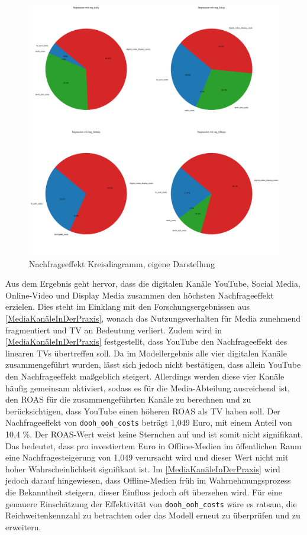 \begin{figure}[H]
    \centering
    \includegraphics[width=1\linewidth]{images/pie_charts_media_regression.png}
    \caption{Nachfrageeffekt Kreisdiagramm, eigene Darstellung}
    \label{fig:nachfrageeffekteKreisdiagramm}
\end{figure}
Aus dem Ergebnis geht hervor, dass die digitalen Kanäle YouTube, Social Media, Online-Video und Display Media zusammen den höchsten Nachfrageeffekt erzielen. Dies steht im Einklang mit den Forschungsergebnissen aus \autoref{MediaKanäleInDerPraxis}, wonach das Nutzungsverhalten für Media zunehmend fragmentiert und TV an Bedeutung verliert. Zudem wird in \autoref{MediaKanäleInDerPraxis} festgestellt, dass YouTube den Nachfrageeffekt des linearen TVs übertreffen soll. Da im Modellergebnis alle vier digitalen Kanäle zusammengeführt wurden, lässt sich jedoch nicht bestätigen, dass allein YouTube den Nachfrageeffekt maßgeblich steigert. Allerdings werden diese vier Kanäle häufig gemeinsam aktiviert, sodass es für die Media-Abteilung ausreichend ist, den \ac{ROAS} für die zusammengeführten Kanäle zu berechnen und zu berücksichtigen, dass YouTube einen höheren \ac{ROAS} als TV haben soll. Der Nachfrageeffekt von \verb|dooh_ooh_costs| beträgt 1,049 Euro, mit einem Anteil von 10,4 \%. Der \ac{ROAS}-Wert weist keine Sternchen auf und ist somit nicht signifikant. Das bedeutet, dass pro investiertem Euro in Offline-Medien im öffentlichen Raum eine Nachfragesteigerung von 1,049 verursacht wird und dieser Wert nicht mit hoher Wahrscheinlichkeit signifikant ist. Im \autoref{MediaKanäleInDerPraxis} wird jedoch darauf hingewiesen,  dass Offline-Medien früh im Wahrnehmungsprozess die Bekanntheit steigern, dieser Einfluss jedoch oft übersehen wird. Für eine genauere Einschätzung der Effektivität von \verb|dooh_ooh_costs| wäre es ratsam, die Reichweitenkennzahl zu betrachten oder das Modell erneut zu überprüfen und zu erweitern. \par
